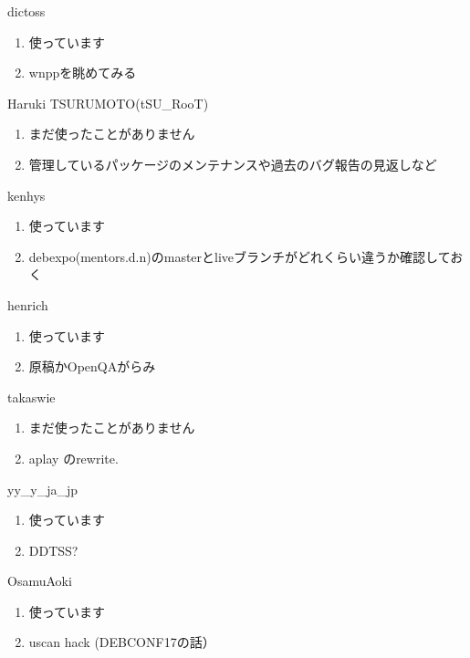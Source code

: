 \begin{prework}{ dictoss }
  \begin{enumerate}
  \item 使っています
  \item wnppを眺めてみる
  \end{enumerate}
\end{prework}

\begin{prework}{ Haruki TSURUMOTO(tSU\_RooT) }
  \begin{enumerate}
  \item まだ使ったことがありません
  \item 管理しているパッケージのメンテナンスや過去のバグ報告の見返しなど
  \end{enumerate}
\end{prework}

\begin{prework}{ kenhys }
  \begin{enumerate}
  \item 使っています
  \item debexpo(mentors.d.n)のmasterとliveブランチがどれくらい違うか確認しておく
  \end{enumerate}
\end{prework}

\begin{prework}{ henrich }
  \begin{enumerate}
  \item 使っています
  \item 原稿かOpenQAがらみ
  \end{enumerate}
\end{prework}

\begin{prework}{ takaswie }
  \begin{enumerate}
  \item まだ使ったことがありません
  \item aplay のrewrite.
  \end{enumerate}
\end{prework}

\begin{prework}{ yy\_y\_ja\_jp }
  \begin{enumerate}
  \item 使っています
  \item DDTSS?
  \end{enumerate}
\end{prework}

\begin{prework}{ OsamuAoki }
  \begin{enumerate}
  \item 使っています
  \item uscan hack (DEBCONF17の話）
  \end{enumerate}
\end{prework}

